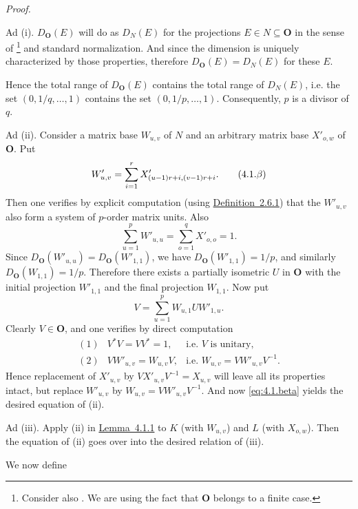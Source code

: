\documentclass[b5paper,twoside]{article}
\newcommand{\lemref}[2]{\hyperref[#1]{\mbox{Lemma~#2}}}
\newcommand{\defref}[2]{\hyperref[#1]{\mbox{Definition~#2}}}
\theoremstyle{mvnplain}
\renewenvironment{proof}[1][Proof]{%
  \par\addvspace{0.35\baselineskip}%
  \noindent\textit{#1.}\ \normalfont\ignorespaces
}{%
  \par\addvspace{0.35\baselineskip}%
}
\newcommand{\N}{\mathbf N}
\def\N{N}%
\def\mathfrak#1{#1}%
\begin{document}
\begin{proof}
Ad (i). \(D_{\mathbf O}(E)\) will do as \(D_{\N}(E)\) for the projections
\(E\in\N\subseteq\mathbf O\) in the sense of
\cite[p.~165, Definition~8.2.1]{ref5}\footnote{Consider also
\cite[p.~170, Lemma~8.3.5]{ref5}. We are using the fact that \(\mathbf O\)
belongs to a finite case.} and standard normalization. And since the dimension
is uniquely characterized by those properties, therefore
\(D_{\mathbf O}(E)=D_{\N}(E)\) for these \(E\).

Hence the total range of \(D_{\mathbf O}(E)\) contains the total range of
\(D_{\N}(E)\), i.e. the set \((0,1/q,\ldots,1)\) contains the set
\((0,1/p,\ldots,1)\). Consequently, \(p\) is a divisor of \(q\).

Ad (ii). Consider a matrix base \(W_{u,v}\) of \(\N\) and an arbitrary matrix
base \(X'_{o,w}\) of \(\mathbf O\). Put
\begin{equation}\label{eq:4.1.beta}
  W'_{u,v}=\sum_{i=1}^{r}X'_{(u-1)r+i,(v-1)r+i}.
  \tag{4.1.\ensuremath{\beta}}
\end{equation}
Then one verifies by explicit computation (using
\defref{def:2.6.1}{2.6.1}) that the \(W'_{u,v}\) also form a system of
\(p\)-order matrix units. Also
\[
  \sum_{u=1}^{p}W'_{u,u}=\sum_{o=1}^{q}X'_{o,o}=1.
\]
Since \(D_{\mathbf O}(W'_{u,u})=D_{\mathbf O}(W'_{1,1})\), we have
\(D_{\mathbf O}(W'_{1,1})=1/p\), and similarly
\(D_{\mathbf O}(W_{1,1})=1/p\). Therefore there exists a partially isometric
\(U\) in \(\mathbf O\) with the initial projection \(W'_{1,1}\) and the final
projection \(W_{1,1}\). Now put
\[
  V=\sum_{u=1}^{p}W_{u,1}UW'_{1,u}.
\]
Clearly \(V\in\mathbf O\), and one verifies by direct computation
\[
\begin{array}{lll}
(1)&V^*V=VV^*=1,&\text{i.e. \(V\) is unitary},\\
(2)&VW'_{u,v}=W_{u,v}V,&
  \text{i.e. \(W_{u,v}=VW'_{u,v}V^{-1}\)}.
\end{array}
\]
Hence replacement of \(X'_{u,v}\) by
\(VX'_{u,v}V^{-1}=X_{u,v}\) will leave all its properties intact, but replace
\(W'_{u,v}\) by \(W_{u,v}=VW'_{u,v}V^{-1}\). And now
\eqref{eq:4.1.beta} yields the desired equation of (ii).

Ad (iii). Apply (ii) in \lemref{lem:4.1.1}{4.1.1} to \(\mathfrak K\) (with
\(W_{u,v}\)) and \(\mathfrak L\) (with \(X_{o,w}\)). Then the equation of
(ii) goes over into the desired relation of (iii).
\end{proof}

We now define
\end{document}
